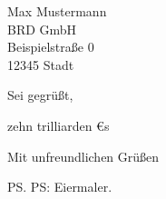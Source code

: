 \documentclass{scrlttr2} %
\begin{document}
\begin{letter}{
	Max Mustermann\\
	BRD GmbH\\
	Beispielstraße 0\\
	12345 Stadt
}


\opening{Sei gegrüßt,}

zehn trilliarden €s


\closing{Mit unfreundlichen Grüßen}

\ps PS: Eiermaler.

\end{letter}
\end{document}
